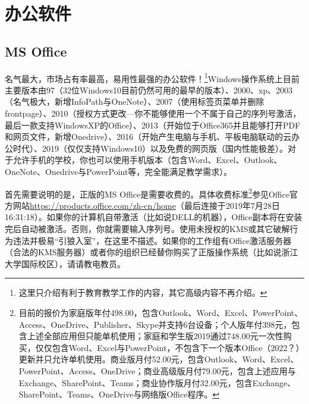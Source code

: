 \section{办公软件}
\subsection{MS Office}
名气最大，市场占有率最高，易用性最强的办公软件！\footnote{这里只介绍有利于教育教学工作的内容，其它高级内容不再介绍。}Windows操作系统上目前主要版本由97（32位Windows10目前仍然可用的最早的版本）、2000、xp、2003（名气极大，新增InfoPath与OneNote）、2007（使用标签页菜单并删除frontpage）、2010（授权方式更改—你不能够使用一个不属于自己的序列号激活，最后一款支持WindowsXP的Office）、2013（开始位于Office365并且能够打开PDF和网页文件，新增Onedrive）、2016（开始产生电脑与手机、平板电脑联动的云办公时代）、2019（仅仅支持Windows10）以及免费的网页版（国内性能极差）。对于允许手机的学校，你也可以使用手机版本（包含Word、Excel、Outlook、OneNote、Onedrive与PowerPoint等，完全能满足教学需求）。\par
首先需要说明的是，正版的MS Office是需要收费的。具体收费标准\footnote{目前的报价为家庭版年付498.00，包含Outlook、Word、Excel、PowerPoint、Access、OneDrive、Publisher、Skype并支持6台设备；个人版年付398元，包含上述全部应用但只能单机使用；家庭和学生版2019通过748.00元一次性购买，仅仅包含Word、Excel与PowerPoint，不包含下一个版本Office（2022？）更新并只允许单机使用。商业版月付52.00元，包含Outlook、Word、Excel、PowerPoint、Access、OneDrive；商业高级版月付79.00元，包含上述应用与Exchange、SharePoint、Teams；商业协作版月付32.00元，包含Exchange、SharePoint、Teams、OneDrive与网络版Office程序。}参见Office官方网站\url{https://products.office.com/zh-cn/home}（最后连接于2019年7月28日16:31:18）。如果你的计算机自带激活（比如说DELL的机器），Office副本将在安装完后自动被激活。否则，你就需要输入序列号。使用未授权的KMS或其它破解行为违法并极易“引狼入室”，在这里不描述。如果你的工作组有Office激活服务器（合法的KMS服务器）或者你的组织已经替你购买了正版操作系统（比如说浙江大学国际校区），请请教电教员。
